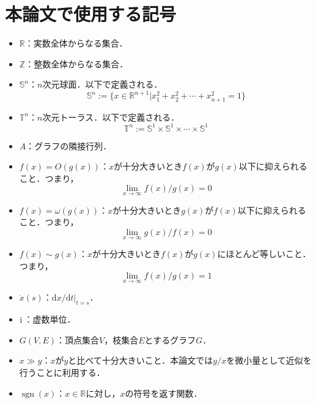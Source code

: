 \documentclass[../main]{subfiles}
\begin{document}
\chapter*{本論文で使用する記号}
\begin{itemize}
    \item
    $\mathbb{R}$：実数全体からなる集合．
    \item
    $\mathbb{Z}$：整数全体からなる集合．
    \item
    $\mathbb{S}^n$：$n$次元球面．以下で定義される．
    \begin{equation*}
        \mathbb{S}^n:=\{x\in\mathbb{R}^{n+1}|x_1^2+x_2^2+\cdots+x_{n+1}^2=1\}
    \end{equation*}    
    \item
    $\mathbb{T}^n$：$n$次元トーラス．以下で定義される．
    \begin{equation*}
        \mathbb{T}^n:=\mathbb{S}^1\times\mathbb{S}^1\times \cdots\times \mathbb{S}^1
    \end{equation*}
    \item 
    $A$：グラフの隣接行列．
    \item
    $f(x)=O(g(x))$：$x$が十分大きいとき$f(x)$が$g(x)$以下に抑えられること．つまり，
    \begin{equation*}
        \lim_{x\to\infty}f(x)/g(x)=0
    \end{equation*}
    \item
    $f(x)=\omega(g(x))$：$x$が十分大きいとき$g(x)$が$f(x)$以下に抑えられること．つまり，
    \begin{equation*}
        \lim_{x\to\infty}g(x)/f(x)=0
    \end{equation*}
    \item
    $f(x)\sim g(x)$：$x$が十分大きいとき$f(x)$が$g(x)$にほとんど等しいこと．つまり，
    \begin{equation*}
        \lim_{x\to\infty}f(x)/g(x)=1
    \end{equation*}    
    \item
    $\dot{x}(s)$：$\mathrm{d}x/\mathrm{d}t|_{t=s}$．
    \item
    ${\mathrm i\,}$：虚数単位．
    \item
    $G(V,E)$：頂点集合$V$，枝集合$E$とするグラフ$G$．
    \item
    $x\gg y$：$x$が$y$と比べて十分大きいこと．本論文では$y/x$を微小量として近似を行うことに利用する．
    \item
    $\operatorname{sgn}(x)$：$x\in\mathbb{R}$に対し，$x$の符号を返す関数．
\end{itemize}
\end{document}
